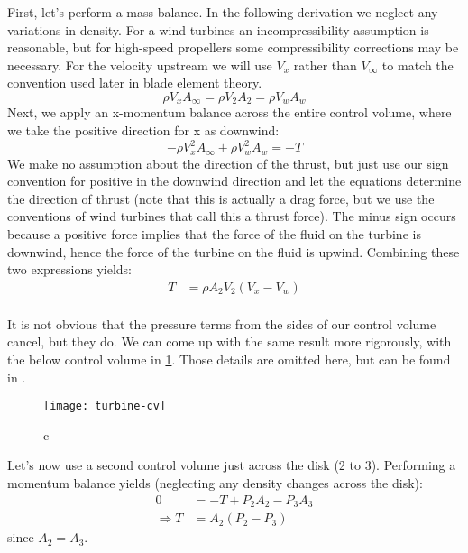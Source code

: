 First, let's perform a mass balance.  In the following derivation we neglect any variations in density.  For a wind turbines an incompressibility assumption is reasonable, but for high-speed propellers some compressibility corrections may be necessary.  For the velocity upstream we will use $V_x$ rather than $V_\infty$ to match the convention used later in blade element theory.
\begin{equation}
    \rho V_x A_\infty = \rho V_2 A_2 = \rho V_w A_w
\end{equation}
Next, we apply an x-momentum balance across the entire control volume, where we take the positive direction for x as downwind:
\begin{equation}
    -\rho V_x^2 A_\infty + \rho V_w^2 A_w = - T
\end{equation}
We make no assumption about the direction of the thrust, but just use our sign convention for positive in the downwind direction and let the equations determine the direction of thrust (note that this is actually a drag force, but we use the conventions of wind turbines that call this a thrust force).  The minus sign occurs because a positive force implies that the force of the fluid on the turbine is downwind, hence the force of the turbine on the fluid is upwind.  Combining these two expressions yields:
\begin{equation}
\begin{aligned}
    T &= \rho A_2 V_2 (V_x - V_w)\\
\end{aligned}
\label{eq:thrust1}
\end{equation}

It is not obvious that the pressure terms from the sides of our control volume cancel, but they do.  We can come up with the same result more rigorously, with the below control volume in \cref{fig:turbine-cv}.  Those details are omitted here, but can be found in \cite{?}.

\begin{figure}[htbp]
\centering
\texttt{[image: turbine-cv]}
\caption{c}
\label{fig:turbine-cv}
\end{figure}

Let's now use a second control volume just across the disk (2 to 3).  Performing a momentum balance yields (neglecting any density changes across the disk):
\begin{equation}
\begin{aligned}
    0 &= - T + P_2 A_2 - P_3 A_3\\
    \Rightarrow T &= A_2 (P_2 - P_3)
\end{aligned}
\label{eq:thrust2}
\end{equation}
since $A_2 = A_3$.


